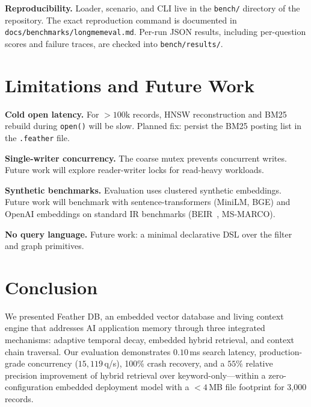 \documentclass[11pt,twocolumn]{article}
\begin{document}
\textbf{Reproducibility.} Loader, scenario, and CLI live in the
\texttt{bench/} directory of the repository. The exact reproduction command is
documented in \texttt{docs/benchmarks/longmemeval.md}. Per-run JSON results,
including per-question scores and failure traces, are checked into
\texttt{bench/results/}.

\section{Limitations and Future Work}
\label{sec:limitations}

\textbf{Cold open latency.} For $> 100$k records, HNSW reconstruction and BM25
rebuild during \texttt{open()} will be slow. Planned fix: persist the BM25
posting list in the \texttt{.feather} file.

\textbf{Single-writer concurrency.} The coarse mutex prevents concurrent writes.
Future work will explore reader-writer locks for read-heavy workloads.

\textbf{Synthetic benchmarks.} Evaluation uses clustered synthetic embeddings.
Future work will benchmark with sentence-transformers (MiniLM, BGE) and OpenAI
embeddings on standard IR benchmarks (BEIR~\citep{thakur2021}, MS-MARCO).

\textbf{No query language.} Future work: a minimal declarative DSL over the
filter and graph primitives.

\section{Conclusion}
\label{sec:conclusion}

We presented Feather DB, an embedded vector database and living context engine
that addresses AI application memory through three integrated mechanisms: adaptive
temporal decay, embedded hybrid retrieval, and context chain traversal. Our
evaluation demonstrates $0.10$\,ms search latency, production-grade concurrency
($15{,}119$\,q/s), 100\% crash recovery, and a $55\%$ relative precision
improvement of hybrid retrieval over keyword-only---within a zero-configuration
embedded deployment model with a $<4$\,MB file footprint for 3,000 records.
\end{document}
